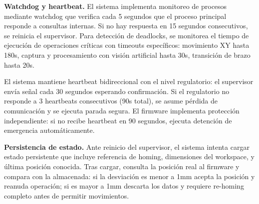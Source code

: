\textbf{Watchdog y heartbeat.} El sistema implementa monitoreo de procesos mediante watchdog que verifica cada 5 segundos que el proceso principal responde a consultas internas. Si no hay respuesta en 15 segundos consecutivos, se reinicia el supervisor. Para detección de deadlocks, se monitorea el tiempo de ejecución de operaciones críticas con timeouts específicos: movimiento XY hasta 180s, captura y procesamiento con visión artificial hasta 30s, transición de brazo hasta 20s.

El sistema mantiene heartbeat bidireccional con el nivel regulatorio: el supervisor envía señal cada 30 segundos esperando confirmación. Si el regulatorio no responde a 3 heartbeats consecutivos (90s total), se asume pérdida de comunicación y se ejecuta parada segura. El firmware implementa protección independiente: si no recibe heartbeat en 90 segundos, ejecuta detención de emergencia automáticamente.

\textbf{Persistencia de estado.} Ante reinicio del supervisor, el sistema intenta cargar estado persistente que incluye referencia de homing, dimensiones del workspace, y última posición conocida. Tras cargar, consulta la posición real al firmware y compara con la almacenada: si la desviación es menor a 1mm acepta la posición y reanuda operación; si es mayor a 1mm descarta los datos y requiere re-homing completo antes de permitir movimientos.
